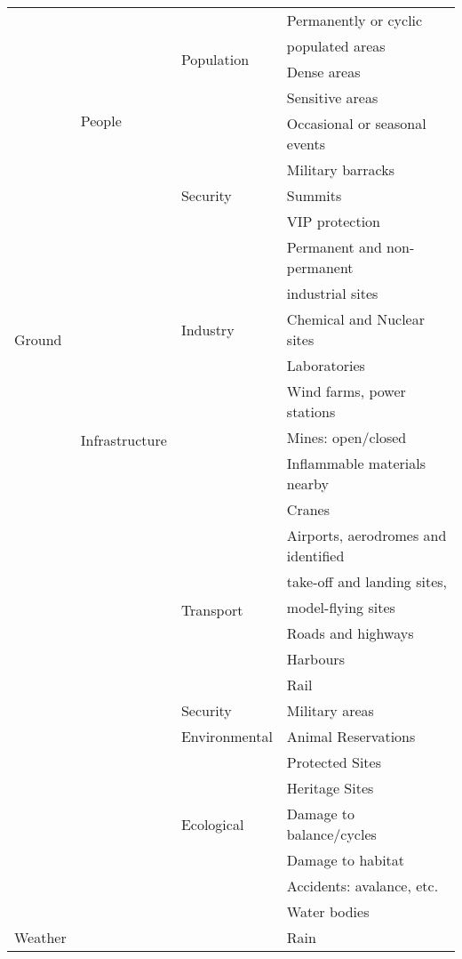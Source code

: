 \documentclass{ua_wgs_base}
\begin{document}
\begin{centering}
\begin{longtable}{|l|l|l|l|}
 \multirow{21}{3em}{Ground} & \multirow{8}{7em}{People}  & \multirow{4}{5em}{Population} & Permanently or cyclic \\
  & & & populated areas \\\cline{4-4}
  & & & Dense areas \\\cline{4-4}
  & & & Sensitive areas \\\cline{4-4}
  & & & Occasional or seasonal events \\\cline{3-4}
  & & \multirow{3}{5em}{Security} & Military barracks \\
  & & & Summits \\
  & & & VIP protection \\\cline{2-4}
  & \multirow{12}{5em}{Infrastructure} & \multirow{5}{3em}{Industry} & Permanent and non-permanent \\
  & & & industrial sites \\\cline{4-4}
  & & & Chemical and Nuclear sites \\\cline{4-4}
  & & & Laboratories \\\cline{4-4}
  & & & Wind farms, power stations \\\cline{4-4}
  & & & Mines: open/closed \\\cline{4-4}
  & & & Inflammable materials nearby \\\cline{4-4}
  & & & Cranes \\\cline{3-4}
  & & \multirow{6}{5em}{Transport} & Airports, aerodromes and identified \\
  & & & take-off and landing sites, \\
  & & & model-flying sites \\\cline{4-4}
  & & & Roads and highways \\\cline{4-4}
  & & & Harbours \\\cline{4-4}
  & & & Rail \\\cline{3-4}
  & & Security & Military areas \\\cline{3-4}
  & & Environmental & Animal Reservations \\\cline{4-4}
  & & & Protected Sites \\\cline{4-4}
  & & & Heritage Sites \\\cline{3-4}
  & & Ecological & Damage to balance/cycles \\\cline{4-4}
  & & & Damage to habitat \\\cline{4-4}
  & & & Accidents: avalance, etc. \\\cline{4-4}
  & & & Water bodies \\\cline{1-4}
 \multirow{5}{3em}{Weather} & & & Rain \\\cline{4-4}

\end{longtable}
\end{centering}
\end{document}
